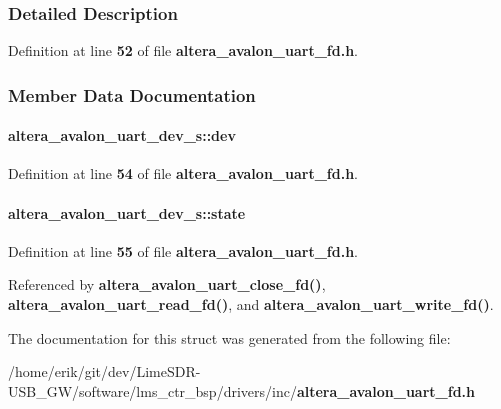 \subsubsection{Detailed Description}


Definition at line {\bf 52} of file {\bf altera\+\_\+avalon\+\_\+uart\+\_\+fd.\+h}.



\subsubsection{Member Data Documentation}
\paragraph[{dev}]{ altera\+\_\+avalon\+\_\+uart\+\_\+dev\+\_\+s\+::dev}\label{structaltera__avalon__uart__dev__s_a15c5c909fb90d18bedde489a794ace3e}


Definition at line {\bf 54} of file {\bf altera\+\_\+avalon\+\_\+uart\+\_\+fd.\+h}.

\paragraph[{state}]{ altera\+\_\+avalon\+\_\+uart\+\_\+dev\+\_\+s\+::state}\label{structaltera__avalon__uart__dev__s_a5f78b9930aa66e07a0085dcce3ebbc6b}


Definition at line {\bf 55} of file {\bf altera\+\_\+avalon\+\_\+uart\+\_\+fd.\+h}.



Referenced by {\bf altera\+\_\+avalon\+\_\+uart\+\_\+close\+\_\+fd()}, {\bf altera\+\_\+avalon\+\_\+uart\+\_\+read\+\_\+fd()}, and {\bf altera\+\_\+avalon\+\_\+uart\+\_\+write\+\_\+fd()}.



The documentation for this struct was generated from the following file\+:\begin{DoxyCompactItemize}
\item 
/home/erik/git/dev/\+Lime\+S\+D\+R-\/\+U\+S\+B\+\_\+\+G\+W/software/lms\+\_\+ctr\+\_\+bsp/drivers/inc/{\bf altera\+\_\+avalon\+\_\+uart\+\_\+fd.\+h}\end{DoxyCompactItemize}
